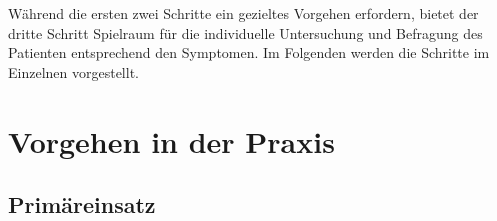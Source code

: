 Während die ersten zwei Schritte ein gezieltes Vorgehen erfordern, bietet der
dritte Schritt Spielraum für die individuelle Untersuchung und Befragung des
Patienten entsprechend den Symptomen. Im Folgenden werden die Schritte
im Einzelnen vorgestellt.

\section{Vorgehen in der Praxis}

\subsection{Primäreinsatz}







